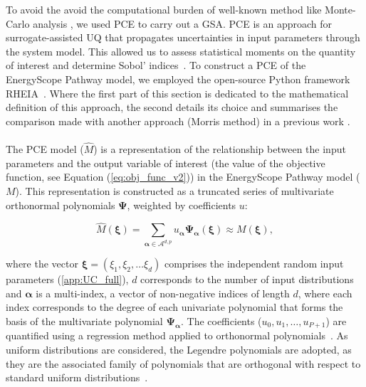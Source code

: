 To avoid the avoid the computational burden of well-known method like Monte-Carlo analysis \cite{yue2018review}, we used \gls{PCE} to carry out a \gls{GSA}. \gls{PCE} is an approach for surrogate-assisted \gls{UQ} that propagates uncertainties in input parameters through the system model. This allowed us to assess statistical moments on the quantity of interest and determine Sobol' indices~\cite{coppitters2020robust}. To construct a PCE of the EnergyScope Pathway model, we employed the open-source Python framework RHEIA~\cite{coppitters2022rheia,readthedocs_rheia}. Where the first part of this section is dedicated to the mathematical definition of this approach, the second details its choice and summarises the comparison made with another approach (\ie Morris method) in a previous work \cite{limpens2020impact}.\\

\\

\noindent
The PCE model ($\hat{M}$) is a representation of the relationship between the input parameters and the output variable of interest (\ie the value of the objective function, see Equation (\ref{eq:obj_func_v2})) in the EnergyScope Pathway model ($M$). This representation is constructed as a truncated series of multivariate orthonormal polynomials $\bm{\Psi}$, weighted by coefficients $u$:

\begin{equation}
\hat{M} \left( \bm{\xi} \right) = \sum_{\bm{\alpha} \in \mathcal{A}^{d,p}} u_{\bm{\alpha}} \bm{\Psi}_{\bm{\alpha}} \left( \bm{\xi} \right) \approx M \left( \bm{\xi} \right), 
\end{equation}

\noindent where the vector $\bm{\xi} = (\xi_1,\xi_2, \dots \xi_d)$ comprises the independent random input parameters (\autoref{app:UC_full}), $d$ corresponds to the number of input distributions and $\bm{\alpha}$ is a multi-index, \ie a vector of non-negative indices of length $d$, where each index corresponds to the degree of each univariate polynomial that forms the basis of the multivariate polynomial $\bm{\Psi_{\bm{\alpha}}}$. The coefficients ($u_0, u_1, \dots, u_{P+1}$) are quantified using a regression method applied to orthonormal polynomials~\cite{Sudret2014}. As uniform distributions are considered, the Legendre polynomials are adopted, as they are the associated family of polynomials that are orthogonal with respect to standard uniform distributions~\cite{Sudret2014}.

